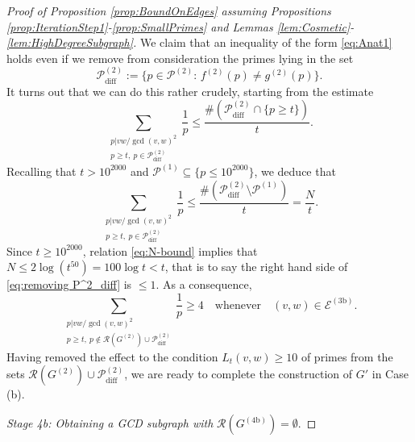 \documentclass[12pt]{amsart}
\numberwithin{equation}{section}
\theoremstyle{definition}
\theoremstyle{remark}
\newcommand{\CE}{\mathcal{E}}
\newcommand{\CP}{\mathcal{P}}
\newcommand{\CR}{\mathcal{R}}
\renewcommand{\le}{\leqslant}
\renewcommand{\ge}{\geqslant}
\begin{document}
\begin{proof}[Proof of Proposition \ref{prop:BoundOnEdges} assuming Propositions \ref{prop:IterationStep1}-\ref{prop:SmallPrimes} and Lemmas \ref{lem:Cosmetic}-\ref{lem:HighDegreeSubgraph}]
We claim that an inequality of the form \eqref{eq:Anat1} holds even if we remove from consideration the primes lying in the set
\[
\CP^{(2)}_{\text{diff}}:=\{p\in\CP^{(2)}:\,f^{(2)}(p)\ne g^{(2)}(p)\}.
\]
It turns out that we can do this rather crudely, starting from the estimate
\[
\sum_{\substack{p|v w/\gcd(v,w)^2\\p\ge t,\ p\in \CP^{(2)}_{\text{diff}}}}\frac{1}{p}
\le \frac{\#(\CP_{\text{diff}}^{(2)}\cap\{p\ge t\})}{t}.
\]
Recalling that $t>10^{2000}$ and $\CP^{(1)}\subseteq\{p\le10^{2000}\}$, we deduce that
\begin{equation}\label{eq:removing P^2_diff}
\sum_{\substack{p|v w/\gcd(v,w)^2\\p\ge t,\ p\in \CP^{(2)}_{\text{diff}}}}\frac{1}{p}
\le \frac{\#(\CP_{\text{diff}}^{(2)}\setminus\CP^{(1)} )}{t}=\frac{N}{t}.
\end{equation}
Since $t\ge 10^{2000}$, relation \eqref{eq:N-bound} implies that $N\le 2\log(t^{50})=100\log t<t$, that is to say the right hand side of \eqref{eq:removing P^2_diff} is $\le 1$. As a consequence,
\begin{equation}
\sum_{\substack{p|v w/\gcd(v,w)^2\\ p\ge t,\ p\notin \CR(G^{(2)})\cup \CP^{(2)}_{\text{diff}}}}\frac{1}{p}\ge 4
\quad\text{whenever}\quad (v,w)\in\CE^{(3\text{b})}.
\label{eq:Anat4}
\end{equation}
Having removed the effect to the condition $L_t(v,w)\ge10$ of primes from the sets $\CR(G^{(2)})\cup\CP_{\text{diff}}^{(2)}$, we are ready to complete the construction of $G'$ in Case (b).



\bigskip



\noindent 
{\it Stage 4b: Obtaining a GCD subgraph with} $\CR(G^{(4\text{b})})=\emptyset$.

\medskip


\end{proof}
\end{document}
